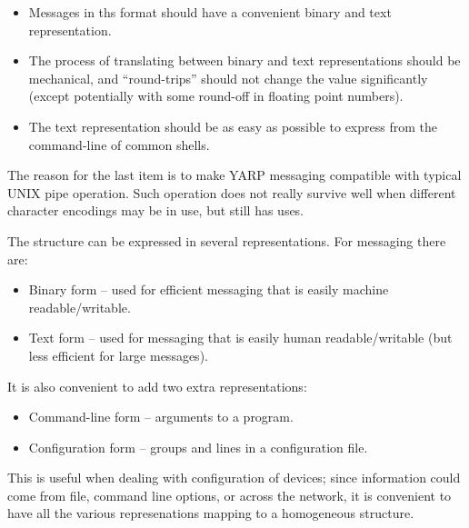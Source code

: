 \begin{itemize} \pflist

\item Messages in ths format should have a convenient binary and text
representation.

\item The process of translating between binary and text
representations should be mechanical, and ``round-trips'' should not
change the value significantly (except potentially with some round-off
in floating point numbers).

\item The text representation should be as easy as possible
to express from the command-line of common shells.

\end{itemize}

The reason for the last item is to make YARP messaging compatible
with typical UNIX pipe operation.  Such operation does not 
really survive well when different character encodings may be
in use, but still has uses.




The structure
can be expressed in several representations.  For messaging there are:

\begin{itemize} \pflist

\item Binary form -- used for efficient messaging that is
easily machine readable/writable.

\item Text form -- used for messaging that is easily human
readable/writable (but less efficient for large messages).

\end{itemize}

It is also convenient to add two extra representations:

\begin{itemize} \pflist

\item Command-line form -- arguments to a program.

\item Configuration form -- groups and lines in a configuration file.

\end{itemize}

This is useful when dealing with configuration of devices; since
information could come from file, command line options, or across the
network, it is convenient to have all the various represenations
mapping to a homogeneous structure.


